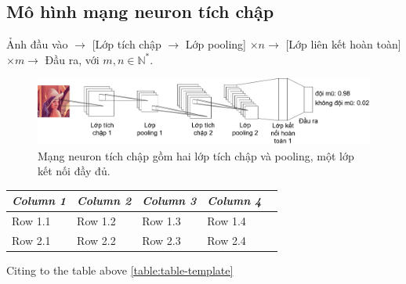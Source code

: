 \subsection{Mô hình mạng neuron tích chập}
Ảnh đầu vào $\rightarrow$ [Lớp tích chập $\rightarrow$ Lớp pooling] $\times n \rightarrow$ [Lớp liên kết hoàn toàn] $\times m \rightarrow$ Đầu ra, với $m,n \in {\mathbb{N}}^*$.
\begin{figure}[ht!]
	\centerline{\includegraphics[scale=0.25]{images/cnn_simplified.png}}
  	\caption{Mạng neuron tích chập gồm hai lớp tích chập và pooling, một lớp kết nối đầy đủ.}
  	\label{fig:cnn_simplified}
\end{figure}
\begin{center}

  \begin{tabular} {l l l l l}
  \toprule
  \it Column 1 & \it Column 2 & \it Column 3 & \it Column 4 \\
  \midrule

  Row 1.1 & Row 1.2 & Row 1.3 & Row 1.4 \\
  Row 2.1 & Row 2.2 & Row 2.3 & Row 2.4 \\  
          
  \bottomrule
  \end{tabular}

\end{center}

Citing to the table above \ref{table:table-template}